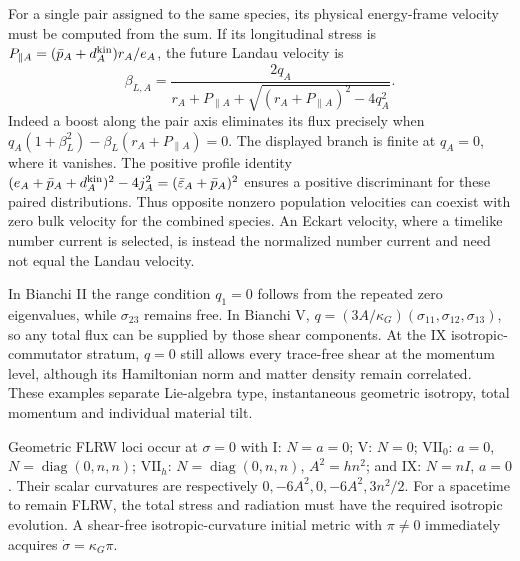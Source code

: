 For a single pair assigned to the same species, its physical energy-frame velocity must be computed from the sum. If its longitudinal stress is
$P_{\parallel A}=(\bar p_A+d_A^{\rm kin})r_A/e_A$, the future Landau velocity is
\begin{equation}
 \beta_{L,A}=\frac{2q_A}{r_A+P_{\parallel A}
                 +\sqrt{(r_A+P_{\parallel A})^2-4q_A^2}}.
 \label{geo:landau_pair}
\end{equation}
Indeed a boost along the pair axis eliminates its flux precisely when
$q_A(1+\beta_L^2)-\beta_L(r_A+P_{\parallel A})=0$.
The displayed branch is finite at $q_A=0$, where it vanishes. The positive profile identity
$(e_A+\bar p_A+d_A^{\rm kin})^2-4j_A^2=(\bar\varepsilon_A+\bar p_A)^2$ ensures a positive discriminant for these paired distributions. Thus opposite nonzero population velocities can coexist with zero bulk velocity for the combined species. An Eckart velocity, where a timelike number current is selected, is instead the normalized number current and need not equal the Landau velocity.

In Bianchi II the range condition $q_1=0$ follows from the repeated zero eigenvalues, while $\sigma_{23}$ remains free. In Bianchi V,
$q=(3A/\kappa_G)(\sigma_{11},\sigma_{12},\sigma_{13})$, so any total flux can be supplied by those shear components. At the IX isotropic-commutator stratum, $q=0$ still allows every trace-free shear at the momentum level, although its Hamiltonian norm and matter density remain correlated. These examples separate Lie-algebra type, instantaneous geometric isotropy, total momentum and individual material tilt.

Geometric FLRW loci occur at $\sigma=0$ with I: $N=a=0$; V: $N=0$; $\mathrm{VII}_0$: $a=0$, $N=\operatorname{diag}(0,n,n)$; $\mathrm{VII}_h$: $N=\operatorname{diag}(0,n,n)$, $A^2=hn^2$; and IX: $N=nI$, $a=0$. Their scalar curvatures are respectively $0,-6A^2,0,-6A^2,3n^2/2$. For a spacetime to remain FLRW, the total stress and radiation must have the required isotropic evolution. A shear-free isotropic-curvature initial metric with $\pi\ne0$ immediately acquires $\dot\sigma=\kappa_G\pi$.


